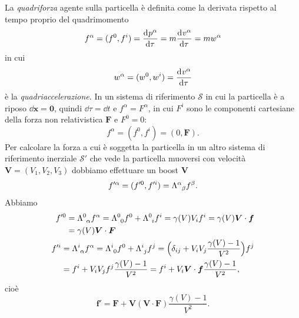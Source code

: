 La \emph{quadriforza} agente sulla particella è definita come
la derivata rispetto al tempo proprio del quadrimomento
\begin{equation}
  f^{\alpha} = (f^{0},f^{i}) =\frac{{\mathop{}\!\mathrm{d}^{}}p^{\alpha}}{\mathop{}\!\mathrm{d} {\tau}^{}} =
  m\frac{{\mathop{}\!\mathrm{d}^{}}v^{\alpha}}{\mathop{}\!\mathrm{d} {\tau}^{}} = mw^{\alpha}
\end{equation}
in cui
\begin{equation}
  w^{\alpha} = (w^{0},w^{i}) =\frac{{\mathop{}\!\mathrm{d}^{}}v^{\alpha}}{\mathop{}\!\mathrm{d} {\tau}^{}}
\end{equation}
è la \emph{quadriaccelerazione}.  In un sistema di
riferimento $\mathcal{S}$ in cui la particella è a riposo $\dd \bm{x} = \bm{0}$,
quindi $\dd \tau = \dd t$ e $f^{\alpha} = F^{\alpha}$, in cui $F^{i}$ sono le
componenti cartesiane della forza non relativistica $\bm{F}$ e $F^{0} = 0$:
\begin{equation}
  f^{\alpha} = (f^{0}, f^{i}) = (0, \bm{F}).
\end{equation}
Per calcolare la forza a cui è soggetta la particella in un altro sistema di
riferimento inerziale $\mathcal{S}'$ che vede la particella muoversi con
velocità $\bm{V} = (V_{1}, V_{2}, V_{3})$ dobbiamo effettuare un boost $\bm{V}$
\begin{equation}
  f'^{\alpha} = (f'^{0}, f'^{i}) = \tensor{\Lambda}{^{\alpha}_{\beta}}f^{\beta}.
\end{equation}
Abbiamo
\begin{subequations}
  \begin{align}
    \begin{split}
      f'^{0} &= \tensor{\Lambda}{^{0}_{\alpha}}f^{\alpha} =
      \tensor{\Lambda}{^{0}_{0}}f^{0} + \tensor{\Lambda}{^{0}_{i}}f^{i} =
      \gamma(V) V_{i}f^{i} = \gamma(V) \bm{V} \cdot \bm{f} \\
      &= \gamma(V) \bm{V} \cdot \bm{F}
    \end{split} \\
    \begin{split}
      f'^{i} &= \tensor{\Lambda}{^{i}_{\alpha}}f^{\alpha} =
      \tensor{\Lambda}{^{i}_{0}}f^{0} + \tensor{\Lambda}{^{i}_{j}}f^{j}
      = \Big( \delta_{ij} + V_{i}V_{j}\frac{\gamma(V) - 1}{V^{2}} \Big)f^{j} \\
      &= f^{i} + V_{i}V_{j}f^{j}\frac{\gamma(V) - 1}{V^{2}} = f^{i} + V_{i}
      \bm{V} \cdot \bm{f} \frac{\gamma(V) - 1}{V^{2}},
    \end{split}
  \end{align}
\end{subequations}
cioè
\begin{equation}
  \bm{f}' = \bm{F} + \bm{V}(\bm{V}\cdot\bm{F})\frac{\gamma(V) - 1}{V^{2}}.
\end{equation}

